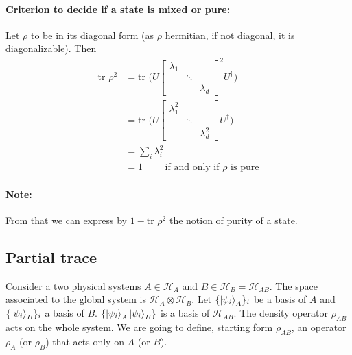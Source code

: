 \documentclass{article}
\begin{document}
\paragraph{Criterion to decide if a state is mixed or pure: }
Let $\rho$ to be in its diagonal form (as $\rho$ hermitian, if not diagonal, it is diagonalizable).
Then
\begin{equation}
    \begin{aligned}
        \text{tr } \rho^2
            & = \text{tr } \Big( U \begin{bmatrix}
                \lambda_1 & & \\ & \ddots & \\ & & \lambda_d
            \end{bmatrix}^2 U^\dagger \Big) \\
            &  = \text{tr } \Big( U \begin{bmatrix}
                \lambda_1^2 & & \\ & \ddots & \\ & & \lambda_d^2
            \end{bmatrix} U^\dagger \Big) \\
            & = \sum_i \lambda_i^2 \\
            & = 1 \qquad \text{ if and only if $\rho$ is pure}
    \end{aligned}
\end{equation}

\paragraph{Note: }From that we can express by $1-\text{tr }\rho^2$ the notion of purity of a state.

\subsection{Partial trace}
Consider a two physical systems $A \in \mathscr{H}_A$ and $B \in \mathscr{H}_B = \mathscr{H}_{AB}$.
The space associated to the global system is $\mathscr{H}_A\otimes\mathscr{H}_B$.
Let $\{\ket{\psi_i}_A\}_i$ be a basis of $A$ and $\{\ket{\psi_i}_B\}_i$ a basis of $B$.
$\{\ket{\psi_i}_A\ket{\psi_i}_B\}$ is a basis of $\mathscr{H}_{AB}$.
The density operator $\rho_{AB}$ acts on the whole system. We are going to define, starting form
$\rho_{AB}$, an operator $\rho_A$ (or $\rho_B$) that acts only on $A$ (or $B$).
\end{document}
